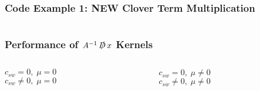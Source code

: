 \documentclass{beamer}
\begin{document}
  \begin{frame}[fragile]
    \frametitle{Code Example 1: NEW Clover Term Multiplication}
    \tiny

    \begin{columns}[T]
      \begin{column}{.5\textwidth}
      \end{column}
      \begin{column}{.5\textwidth}
      \end{column}
    \end{columns}

\end{frame}


  \begin{frame}
    \frametitle{Performance of $A^{-1} \, \slashed D \, x $ Kernels}
    \vspace{-5mm}
    \footnotesize

    \begin{columns}[T]
      \begin{column}{.5\textwidth}
        \begin{center}
          $c_{sw} = 0, \; \mu = 0$ \\
          \vfill
          $c_{sw} \neq 0, \; \mu = 0$ \\
          \vfill
        \end{center}
      \end{column}
      \begin{column}{.5\textwidth}
        \begin{center}
          $c_{sw} = 0, \; \mu \neq 0$ \\
          \vfill
          $c_{sw} \neq 0, \; \mu \neq 0$ \\
          \vfill
        \end{center}
      \end{column}
    \end{columns}

  \end{frame}
\end{document}
